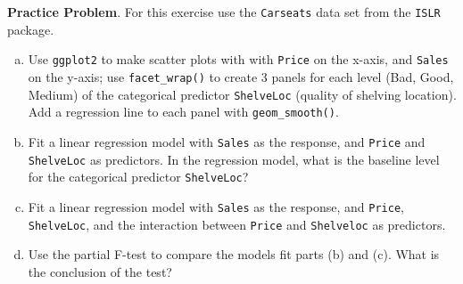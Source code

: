 \documentclass[11pt]{article}\usepackage[]{graphicx}\usepackage[]{color}
\begin{document}
\textbf{Practice Problem}.  For this exercise use the \texttt{Carseats} data set from the \texttt{ISLR} package.
\begin{enumerate}[(a)]
\item Use \texttt{ggplot2} to make scatter plots with with \texttt{Price} on the x-axis, and \texttt{Sales} on the y-axis; use \texttt{facet\_wrap()} to create 3 panels for each level (Bad, Good, Medium) of the categorical predictor \texttt{ShelveLoc} (quality of shelving location).  Add a regression  line to each panel with \texttt{geom\_smooth()}.
\item Fit a linear regression model with \texttt{Sales} as the response, and \texttt{Price} and \texttt{ShelveLoc} as predictors.  In the regression model, what is the baseline level for the categorical predictor \texttt{ShelveLoc}?
\item Fit a linear regression model with \texttt{Sales} as the response, and \texttt{Price}, \texttt{ShelveLoc}, and the interaction between \texttt{Price} and \texttt{Shelveloc} as predictors.
\item Use the partial F-test to compare the models fit parts (b) and (c).  What is the conclusion of the test?
\end{enumerate}
\end{document}
